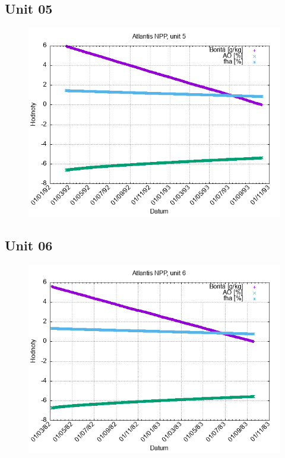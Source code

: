 \documentclass{article}
\begin{document}
\subsection*{Unit 05}
\begin{figure}[h!]
\centering
\includegraphics[width=14cm]{./grafy/Atlantis05.png}
\end{figure}
\clearpage
\subsection*{Unit 06}
\begin{figure}[h!]
\centering
\includegraphics[width=14cm]{./grafy/Atlantis06.png}
\end{figure}
\clearpage
\end{document}
